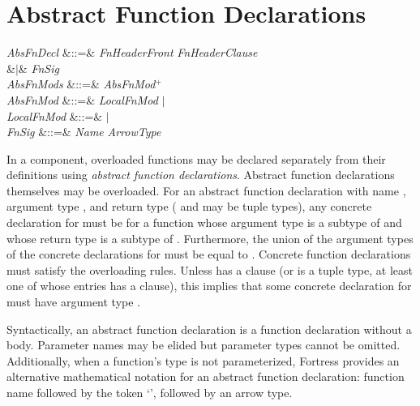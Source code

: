 \section{Abstract Function Declarations}

\begin{Grammar}
\emph{AbsFnDecl} &::=&  \emph{FnHeaderFront}
\emph{FnHeaderClause}\\
&$|$& \emph{FnSig} \\

\emph{AbsFnMods} &::=& \emph{AbsFnMod}$^+$\\

\emph{AbsFnMod} &::=& \emph{LocalFnMod} $|$ \\

\emph{LocalFnMod} &::=&  $|$ \\

\emph{FnSig} &::=& \emph{Name} \EXP{\mathrel{\mathtt{:}}} \emph{ArrowType}\\
\end{Grammar}

In a component, overloaded functions may be declared separately from their
definitions using \emph{abstract function declarations}.
Abstract function declarations themselves may be overloaded.
For an abstract function declaration with name , argument type
, and return type  ( and  may be tuple types),
any concrete declaration for  must be for a function whose argument
type is a subtype of  and whose return type is a subtype of .
Furthermore, the union of the argument types of the concrete declarations for
 must be equal to .
Concrete function declarations must satisfy the overloading rules.
Unless  has a  clause (or is a tuple type, at least
one of whose entries has a  clause), this implies that some
concrete declaration for  must have argument type .

Syntactically, an abstract function declaration is a function declaration
without a body.  Parameter names may be elided but parameter types cannot
be omitted.  Additionally, when a function's type is not parameterized,
Fortress provides an alternative mathematical notation for
an abstract function declaration: function name followed by the token
`\EXP{\COLONOP}', followed by an arrow type.

